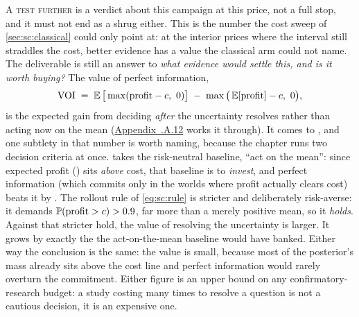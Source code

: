 A \textsc{test further} is a verdict about this campaign at this price, not a full stop, and it must
not end as a shrug either. This is the number the cost sweep of \cref{sec:sc:classical} could only
point at: at the interior prices where the interval still straddles the cost, better evidence has a
value the classical arm could not name. The deliverable is still an answer to
\emph{what evidence would settle this, and is it worth buying?} The value of perfect information,
%
\begin{equation}
  \text{VOI} \;=\; \E\big[\max(\text{profit} - c,\ 0)\big] \;-\; \max\big(\E[\text{profit}] - c,\ 0\big),
  \label{eq:sc:voi}
\end{equation}
%
is the expected gain from deciding \emph{after} the uncertainty resolves rather than acting now on the
mean \citep{raiffa1961} (\hyperref[app:sc:voi]{Appendix~\thechapter.A.12} works it through).
It comes to \keur{\nbSevenVoi}, and one subtlety in that number is worth
naming, because the chapter runs two decision criteria at once.  takes the risk-neutral
baseline, ``act on the mean'': since expected profit (\keur{\nbSevenExpProfit}) sits \keur{\nbSevenExpNet}
\emph{above} cost, that baseline is to \emph{invest}, and perfect information (which commits only in the
worlds where profit actually clears cost) beats it by \keur{\nbSevenVoi}. The rollout rule of
\cref{eq:sc:rule} is stricter and deliberately risk-averse: it demands $\operatorname{\mathbb{P}}(\text{profit} > c) > 0.9$,
far more than a merely positive mean, so it \emph{holds}. Against that stricter hold, the value of
resolving the uncertainty is larger. It grows by exactly the \keur{\nbSevenExpNet} the
act-on-the-mean baseline would have banked. Either way the conclusion is the same: the value is
small, because most of the posterior's mass already sits above the cost line and perfect information
would rarely overturn the commitment. Either
figure is an upper bound on any confirmatory-research budget: a study costing many times \keur{\nbSevenVoi}
to resolve a \keur{\nbSevenVoi} question is not a cautious decision, it is an expensive one.

